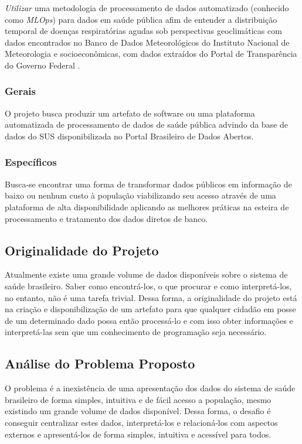 \documentclass[journal]{IEEEtran}
\begin{document}
\emph{Utilizar} uma metodologia de processamento de dados automatizado (conhecido como \emph{MLOps}) para dados em saúde pública afim de entender a distribuição temporal de doenças respiratórias agudas sob perspectivas geoclimáticas com dados encontrados no Banco de Dados Meteorológicos do Instituto Nacional de Meteorologia\cite{bdmep_2020} e socioeconômicas, com dados extraídos do Portal de Transparência do Governo Federal \cite{PortalTransparência2020}.

\subsubsection{Gerais}
O projeto busca produzir um artefato de software ou uma plataforma automatizada de processamento de dados de saúde pública advindo da base de dados do SUS disponibilizada no Portal Brasileiro de Dados Abertos\cite{DadosGov}.


\subsubsection{Específicos}
Busca-se encontrar uma forma de transformar dados públicos em informação de baixo ou nenhum custo à população viabilizando seu acesso através de uma plataforma de alta disponibilidade aplicando as melhores práticas na esteira de processamento e tratamento dos dados diretos de banco.
\subsection{Originalidade do Projeto}
Atualmente existe uma grande volume de dados disponíveis sobre o sistema de saúde brasileiro. Saber como encontrá-los, o que procurar e como interpretá-los, no entanto, não é uma tarefa trivial. Dessa forma, a originalidade do projeto está na criação e disponibilização de um artefato para que qualquer cidadão em posse de um determinado dado possa então processá-lo e com isso obter informações e interpretá-las sem que um conhecimento de programação seja necessário.
\subsection{Análise do Problema Proposto}
O problema é a inexistência de uma apresentação dos dados do sistema de saúde brasileiro de forma simples, intuitiva e de fácil acesso a população, mesmo existindo um grande volume de dados disponível. Dessa forma, o desafio é conseguir centralizar estes dados, interpretá-los e relacioná-los com aspectos externos e apresentá-los de forma simples, intuitiva e acessível para todos. 
\end{document}
